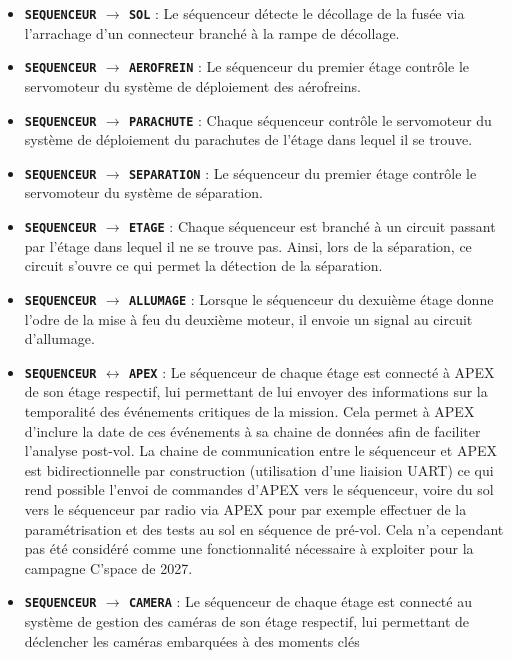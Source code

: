 \begin{itemize}
    \item \textbf{\texttt{SEQUENCEUR} $\longrightarrow$ \texttt{SOL}} : Le séquenceur détecte le décollage de la fusée via
    l'arrachage d'un connecteur branché à la rampe de décollage.
    \item \textbf{\texttt{SEQUENCEUR} $\longrightarrow$ \texttt{AEROFREIN}} : Le séquenceur du premier étage contrôle le
    servomoteur du système de déploiement des aérofreins.
    \item \textbf{\texttt{SEQUENCEUR} $\longrightarrow$ \texttt{PARACHUTE}} : Chaque séquenceur contrôle le servomoteur du
    système de déploiement du parachutes de l'étage dans lequel il se trouve.
    \item \textbf{\texttt{SEQUENCEUR} $\longrightarrow$ \texttt{SEPARATION}} : Le séquenceur du premier étage contrôle le
    servomoteur du système de séparation.
    \item \textbf{\texttt{SEQUENCEUR} $\longrightarrow$ \texttt{ETAGE}} : Chaque séquenceur est branché à un circuit passant par
    l'étage dans lequel il ne se trouve pas. Ainsi, lors de la séparation, ce circuit s'ouvre ce qui permet la détection  de la
    séparation.
    \item \textbf{\texttt{SEQUENCEUR} $\longrightarrow$ \texttt{ALLUMAGE}} : Lorsque le séquenceur du dexuième étage donne l'odre
    de la mise à feu du deuxième moteur, il envoie un signal au circuit d'allumage.
    \item \textbf{\texttt{SEQUENCEUR} $\longleftrightarrow$ \texttt{APEX}} : Le séquenceur de chaque étage est connecté à APEX de
    son étage respectif, lui permettant de lui envoyer des informations sur la temporalité des événements critiques de la
    mission. Cela permet à APEX d'inclure la date de ces événements à sa chaine de données afin de faciliter l'analyse post-vol.
    La chaine de communication entre le séquenceur et APEX est bidirectionnelle par construction (utilisation d'une liaision
    \acrshort{UART}) ce qui rend possible l'envoi de commandes d'APEX vers le séquenceur, voire du sol vers le séquenceur par radio
    via APEX pour par exemple effectuer de la paramétrisation et des tests au sol en séquence de pré-vol. Cela n'a cependant pas
    été considéré comme une fonctionnalité nécessaire à exploiter pour la campagne C'space de 2027.
    \item \textbf{\texttt{SEQUENCEUR} $\longrightarrow$ \texttt{CAMERA}} : Le séquenceur de chaque étage est connecté au
    système de gestion des caméras de son étage respectif, lui permettant de déclencher les caméras embarquées à des moments clés

\end{itemize}
